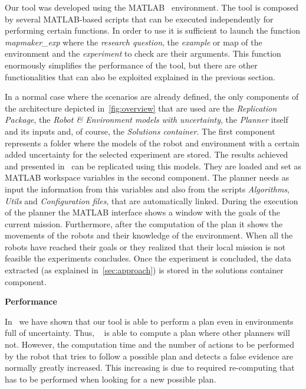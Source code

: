 
Our tool was developed using the MATLAB~\cite{matlab} environment.
The tool is composed by several MATLAB-based scripts that can be executed independently for performing certain functions.
In order to use \toolName it is sufficient to launch the function \emph{mapmaker\_exp} where the \emph{research question}, the \emph{example} or map of the environment and the \emph{experiment} to check are their arguments.
This function enormously simplifies the performance of the tool, but there are other functionalities that can also be exploited explained in the previous section.

In a normal case where the scenarios are already defined, the only components of the architecture depicted in~\ref{fig:overview} that are used are the \emph{Replication Package}, the \emph{Robot \& Environment models with uncertainty}, the \emph{Planner} itself and its inputs and, of course, the \emph{Solutions container}.
The first component represents a folder where the models of the robot and environment with a certain added uncertainty for the selected experiment are stored.
The results achieved and presented in~\cite{mapmaker17} can be replicated using this models.
They are loaded and set as MATLAB workspace variables in the second component.
The planner needs as input the information from this variables and also from the scripts \emph{Algorithms}, \emph{Utils} and \emph{Configuration files}, that are automatically linked.
During the execution of the planner  the MATLAB interface shows a window with the goals of the current mission. 
Furthermore, after the computation of the plan it shows the movements of the robots and their knowledge of the environment.
When all the robots have reached their goals or they realized that their local mission is not feasible the experiments concludes.
Once the experiment is concluded, the data extracted (as explained in~\ref{sec:approach}) is stored in the solutions container component.

\textbf{Performance}

In~\cite{mapmaker17}  we have shown that our tool is able to perform a plan even in environments full of uncertainty.
Thus, \toolName~ is able to compute a plan where other planners will not.
However, the computation time and the number of actions to be performed by the robot that tries to follow a possible plan and detects a false evidence are normally greatly increased.
This increasing is due to required re-computing that has to be performed when looking for a new possible plan.

